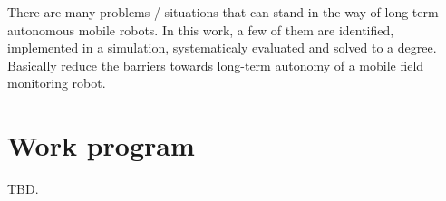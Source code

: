 \documentclass[german, master, expose, latin1]{base/thesis_KBS}
\begin{document}
There are many problems / situations that can stand in the way of long-term autonomous mobile robots. In this work, a few of them are identified,
implemented in a simulation, systematicaly evaluated and solved to a degree. Basically reduce the barriers towards long-term autonomy of a mobile field
monitoring robot.

\section{Work program}

TBD.


\end{document}
